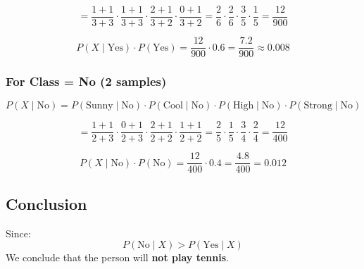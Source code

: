 \documentclass{article}
\begin{document}
$$
= \frac{1+1}{3+3} \cdot \frac{1+1}{3+3} \cdot \frac{2+1}{3+2} \cdot \frac{0+1}{3+2}
= \frac{2}{6} \cdot \frac{2}{6} \cdot \frac{3}{5} \cdot \frac{1}{5} = \frac{12}{900}
$$

$$
P(X \mid \text{Yes}) \cdot P(\text{Yes}) = \frac{12}{900} \cdot 0.6 = \frac{7.2}{900} \approx 0.008
$$

\subsubsection*{For Class = No (2 samples)}

$$
P(X \mid \text{No}) = P(\text{Sunny} \mid \text{No}) \cdot P(\text{Cool} \mid \text{No}) \cdot P(\text{High} \mid \text{No}) \cdot P(\text{Strong} \mid \text{No})
$$

$$
= \frac{1+1}{2+3} \cdot \frac{0+1}{2+3} \cdot \frac{2+1}{2+2} \cdot \frac{1+1}{2+2}
= \frac{2}{5} \cdot \frac{1}{5} \cdot \frac{3}{4} \cdot \frac{2}{4} = \frac{12}{400}
$$

$$
P(X \mid \text{No}) \cdot P(\text{No}) = \frac{12}{400} \cdot 0.4 = \frac{4.8}{400} = 0.012
$$

\subsection*{Conclusion}

Since:
$$
P(\text{No} \mid X) > P(\text{Yes} \mid X)
$$
We conclude that the person will \textbf{not play tennis}.
\end{document}
